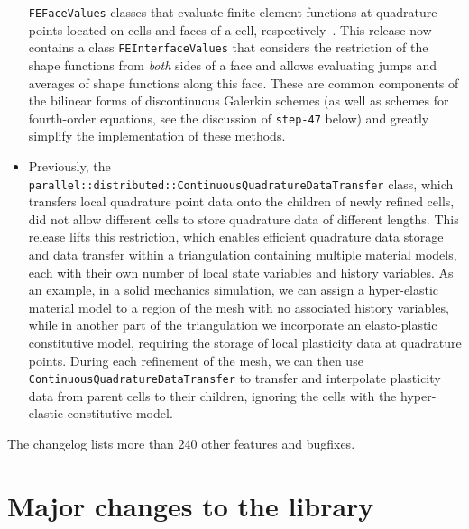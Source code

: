 \documentclass{ansarticle-preprint}
\begin{document}
\begin{itemize}
        \texttt{FEFaceValues} classes that evaluate finite element functions
        at quadrature points located on cells and faces of a cell,
        respectively~\cite{BangerthHartmannKanschat2007}. This release now
        contains a class \texttt{FEInterfaceValues} that considers the
        restriction of the shape functions from \textit{both} sides of a face and
        allows evaluating jumps and averages of shape functions along this
        face. These are common components of the bilinear forms of
        discontinuous Galerkin schemes (as well as schemes for fourth-order
        equations, see the discussion of \texttt{step-47} below) and greatly
        simplify the implementation of these methods.
  \item Previously, the \texttt{parallel::distributed::ContinuousQuadratureDataTransfer}
        class, which transfers local quadrature point data onto the
        children of newly refined cells, did not allow different cells
        to store quadrature data of different lengths. This release lifts
        this restriction, which enables efficient quadrature data storage and data
        transfer within a triangulation containing multiple material models, each with
        their own number of local state variables and history variables.
        As an example, in a solid mechanics simulation, we can assign a hyper-elastic
        material model to a region of the mesh with no associated
        history variables, while in another part of the triangulation we incorporate an
        elasto-plastic constitutive model, requiring the storage of local plasticity
        data at quadrature points.
        During each refinement of the mesh, we can then use
        \texttt{ContinuousQuadratureDataTransfer} to transfer and interpolate
        plasticity data from parent cells to their children, ignoring the cells
        with the hyper-elastic constitutive model.
\end{itemize}
%
The changelog lists more than 240 other
features and bugfixes.




\section{Major changes to the library}
\label{sec:major}
\end{document}
